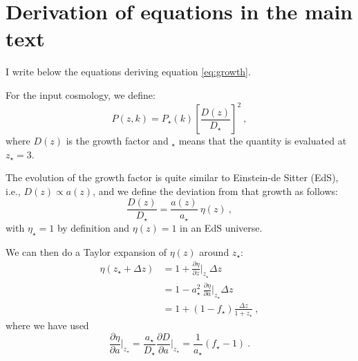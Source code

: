 \section{Derivation of equations in the main text} \label{app:eq}

I write below the equations deriving equation \ref{eq:growth}.

For the input cosmology, we define:
\begin{equation}
 P(z,k) = P_\star(k) \left[ \frac{D(z)}{D_\star} \right]^2 ~,
\end{equation}
where $D(z)$ is the growth factor and $_\star$ means that the quantity is 
evaluated at $z_\star=3$. 

The evolution of the growth factor is quite similar to Einstein-de Sitter 
(EdS), i.e., $D(z) \propto a(z)$, and we define the deviation from that growth 
as follows:
\begin{equation}
 \frac{D(z)}{D_\star} = \frac{a(z)}{a_\star} ~ \eta(z) ~,
\end{equation}
with $\eta_\star=1$ by definition and $\eta(z)=1$ in an EdS universe.

We can then do a Taylor expansion of $\eta(z)$ around $z_\star$:
\begin{align}
 \eta(z_\star+\Delta z) 
  & = 1 + \frac{\partial \eta}{\partial z} 
      \Bigr\rvert_{z_\star} \Delta z                    \nonumber \\
  & = 1 - a_\star^2~\frac{\partial \eta}{\partial a} 
      \Bigr\rvert_{z_\star} \Delta z                    \nonumber \\
  & = 1 + \left( 1 - f_\star \right) \frac{\Delta z}{1+z_\star} ~,
\end{align}
where we have used 
\begin{equation}
 \frac{\partial \eta}{\partial a} \Bigr\rvert_{z_\star} 
  = \frac{a_\star}{D_\star} \frac{\partial D}{\partial a} \Bigr\rvert_{z_\star}
  = \frac{1}{a_\star} \left( f_\star - 1 \right) ~.
\end{equation}

